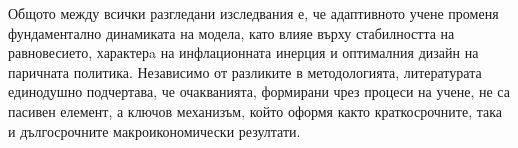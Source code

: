 Общото между всички разгледани изследвания е, че адаптивното учене променя фундаментално динамиката на модела, като влияе върху стабилността на равновесието, характерa на инфлационната инерция и оптималния дизайн на паричната политика. Независимо от разликите в методологията, литературата единодушно подчертава, че очакванията, формирани чрез процеси на учене, не са пасивен елемент, а ключов механизъм, който оформя както краткосрочните, така и дългосрочните макроикономически резултати.

 
